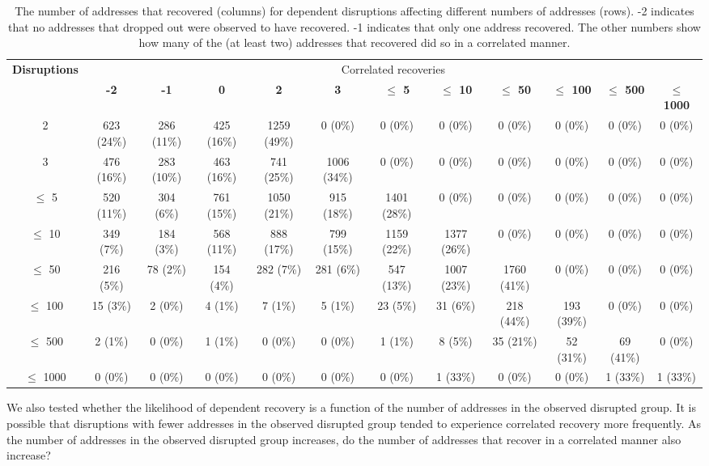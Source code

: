 \begin{table*}[th]
  \centering
  \hspace{-0.04in}\tiny
  \begin{tabular}{c|c|c|c|c|c|c|c|c|c|c|c|}
\textbf{Disruptions} & \multicolumn{11}{c|}{Correlated recoveries} \\
    & \textbf{-2} & \textbf{-1} & \textbf{0} & \textbf{2} &
    \textbf{3} & \textbf{$\leq$ 5} & \textbf{$\leq$ 10}  &
    \textbf{$\leq$ 50}  & \textbf{$\leq$ 100} & \textbf{$\leq$ 500}  &
    \textbf{$\leq$ 1000}\\
    \hline
2 & 623 (24\%) & 286 (11\%) & 425 (16\%) & 1259 (49\%) & 0 (0\%) & 0 (0\%) & 0 (0\%) & 0 (0\%) & 0 (0\%) & 0 (0\%) & 0 (0\%)\\
3 & 476 (16\%) & 283 (10\%) & 463 (16\%) & 741 (25\%) & 1006 (34\%) & 0 (0\%) & 0 (0\%) & 0 (0\%) & 0 (0\%) & 0 (0\%) & 0 (0\%)\\
$\leq$ 5 & 520 (11\%) & 304 (6\%) & 761 (15\%) & 1050 (21\%) & 915 (18\%) & 1401 (28\%) & 0 (0\%) & 0 (0\%) & 0 (0\%) & 0 (0\%) & 0 (0\%)\\
$\leq$ 10 & 349 (7\%) & 184 (3\%) & 568 (11\%) & 888 (17\%) & 799 (15\%) & 1159 (22\%) & 1377 (26\%) & 0 (0\%) & 0 (0\%) & 0 (0\%) & 0 (0\%)\\
$\leq$ 50 & 216 (5\%) & 78 (2\%) & 154 (4\%) & 282 (7\%) & 281 (6\%) & 547 (13\%) & 1007 (23\%) & 1760 (41\%) & 0 (0\%) & 0 (0\%) & 0 (0\%)\\
$\leq$ 100 & 15 (3\%) & 2 (0\%) & 4 (1\%) & 7 (1\%) & 5 (1\%) & 23 (5\%) & 31 (6\%) & 218 (44\%) & 193 (39\%) & 0 (0\%) & 0 (0\%)\\
$\leq$ 500 & 2 (1\%) & 0 (0\%) & 1 (1\%) & 0 (0\%) & 0 (0\%) & 1 (1\%) & 8 (5\%) & 35 (21\%) & 52 (31\%) & 69 (41\%) & 0 (0\%)\\
$\leq$ 1000 & 0 (0\%) & 0 (0\%) & 0 (0\%) & 0 (0\%) & 0 (0\%) & 0 (0\%) & 1 (33\%) & 0 (0\%) & 0 (0\%) & 1 (33\%) & 1 (33\%)\\
    \end{tabular}
  \caption[Dependent recovery]{\label{tbl:nouts_vs_nrecs} The number of addresses that
    recovered (columns) for dependent disruptions affecting different numbers of
    addresses (rows). -2 indicates that no addresses that dropped out
    were observed to have recovered. -1 indicates that only one address recovered. The other
    numbers show how many of the (at least two) addresses that
    recovered did so in a correlated manner.
  }
\end{table*}

We also tested whether the likelihood of dependent recovery is a
function of the number of addresses in the observed disrupted group.
%
It is possible
that disruptions with fewer addresses in the observed disrupted group
tended to experience correlated recovery more frequently. 
%
As the number of
addresses in the observed disrupted group increases, do the number of
addresses that recover in a correlated manner also increase?


